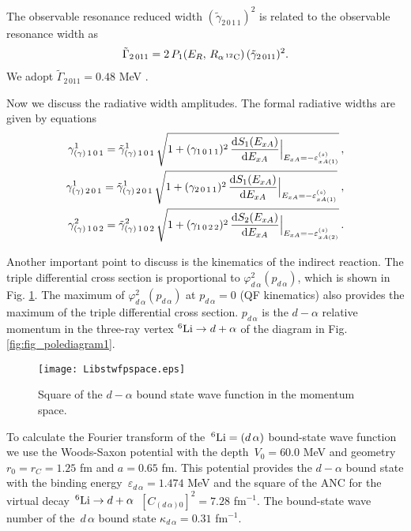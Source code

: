 \documentclass[prl,unsortedaddress,groupedaddress,twocolumn,amsmath,amsfonts,amssymb,showpacs,floatfix,nofootinbib]{revtex4}
\begin{document}
The observable resonance reduced width $ ({\tilde \gamma}_{2\,0\,1\,1})^{2} $ is related to the observable resonance width as
\begin{align}
{\tilde \Gamma}_{2\,011}=2\,P_{1}(E_{R},\,R_{\alpha\,{}^{12}{\rm C}})\,({\tilde \gamma}_{2\,011})^{2}.
\label{Gammaredwidth2}
\end{align}
We adopt ${\tilde \Gamma}_{2\,011}=0.48$ MeV \cite{tiley}. 

Now we discuss the radiative width amplitudes.
The formal radiative widths are given by equations
\begin{align}
\gamma_{(\gamma)\,1\,0\,1}^{1} = {\tilde \gamma}_{(\gamma)\,1\,0\,1}^{1}\,
\sqrt{1+(\gamma_{1\,0\,1\,1})^{2}\,\frac{ {\rm d}S_{1}(E_{xA}) }{  {\rm d}E_{xA} }\Big|_{ E_{xA}=-\varepsilon_{xA(1)}^{(s)}} }\,, \nonumber\\
\gamma_{(\gamma)\,2\,0\,1}^{1} = {\tilde \gamma}_{(\gamma)\,2\,0\,1}^{1}\,
\sqrt{1+(\gamma_{2\,0\,1\,1})^{2}\,\frac{ {\rm d}S_{1}(E_{xA}) }{  {\rm d}E_{xA} }\Big|_{ E_{xA}=-\varepsilon_{xA(1)}^{(s)}} }\,\,,    \nonumber\\    
\gamma_{(\gamma)\,1\,0\,2}^{2} = {\tilde \gamma}_{(\gamma)\,1\,0\,2}^{2}\,
\sqrt{1+(\gamma_{1\,0\,2\,2})^{2}\,\frac{ {\rm d}S_{2}(E_{xA}) }{  {\rm d}E_{xA} }\Big|_{ E_{xA}=-\varepsilon_{xA(2)}^{(s)}} }\,.
\label{radwidths1}
\end{align}

Another important point to discuss is the kinematics of the indirect reaction. The triple differential cross section is proportional to $\varphi_{d\,\alpha}^{2}(p_{d\,\alpha})$, which is shown in Fig. \ref{fig_6Libstwfpspace}. The maximum of $\varphi_{d\,\alpha}^{2}(p_{d\,\alpha})$ at $p_{d\,\alpha}=0$ (QF kinematics) also provides the maximum of the triple differential cross section. $p_{d\,\alpha}$ is the $d-\alpha$ relative momentum  in the three-ray vertex ${}^{6}{\rm Li} \to d + \alpha$ of the diagram in Fig. \ref{fig:fig_polediagram1}.
\begin{figure}
[tbp] 
  \texttt{[image: Libstwfpspace.eps]}
  \caption{Square of the $d-\alpha$ bound state wave function in the momentum space.}  \label{fig_6Libstwfpspace}
\end{figure}  
To calculate the Fourier transform of the $\,{}^{6}{\rm Li}=(d\,\alpha)$ bound-state wave function we use the Woods-Saxon potential with the depth $\,V_{0}= 60.0$ MeV and geometry $r_{0}=r_{C}=1.25$ fm and $a=0.65$ fm. This potential provides the $d-\alpha$ bound state with the binding energy $\,\varepsilon_{d\,\alpha}= 1.474$ MeV and the square of the ANC for the virtual decay
$\,{}^{6}{\rm Li} \to d + \alpha$  $\,[C_{(d\,\alpha)0}]^{2}= 7.28$ fm$^{-1}$. The bound-state wave number of the $\,d\,\alpha$ bound state $\kappa_{d\,\alpha}= 0.31$ fm$^{-1}$.
\end{document}
